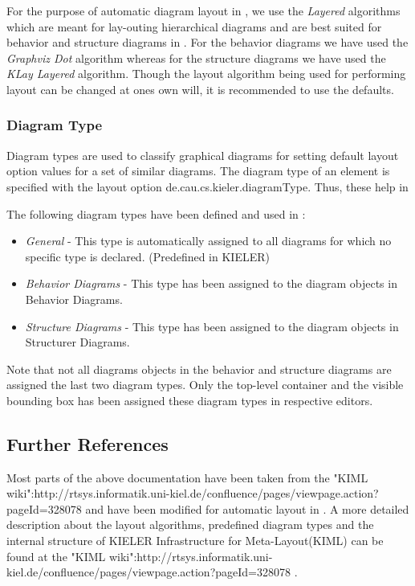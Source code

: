 For the purpose of automatic diagram layout in \eTrice{}, we use the \textit{Layered} algorithms which are 
meant for lay-outing hierarchical diagrams and are best suited for behavior and structure diagrams in 
\eTrice{}. For the behavior diagrams we have used the \textit{Graphviz Dot} algorithm whereas for the 
structure diagrams we have used the \textit{KLay Layered} algorithm. Though the layout algorithm being 
used for performing layout can be changed at ones own will, it is recommended to use the defaults.  

\subsubsection{Diagram Type}

Diagram types are used to classify graphical diagrams for setting default layout option values for a set 
of similar diagrams. The diagram type of an element is specified with the layout option 
de.cau.cs.kieler.diagramType. Thus, these help in 

The following diagram types have been defined and used in \eTrice{}:
\begin{itemize}
\item \textit{General} - This type is automatically assigned to all diagrams for which no specific type is 
declared. (Predefined in KIELER)
\item \textit{\eTrice{} Behavior Diagrams} - This type has been assigned to the diagram objects in \eTrice{} 
Behavior Diagrams. 
\item \textit{\eTrice{} Structure Diagrams} - This type has been assigned to the diagram objects in \eTrice{} 
Structurer Diagrams.
\end{itemize}
Note that not all diagrams objects in the behavior and structure diagrams are assigned the last two 
diagram types. Only the top-level container and the visible bounding box has been assigned these diagram 
types in respective editors.

\subsection{Further References}

Most parts of the above documentation have been taken from the "KIML 
wiki":http://rtsys.informatik.uni-kiel.de/confluence/pages/viewpage.action?pageId=328078 and have been 
modified for automatic layout in \eTrice{}. A more detailed description about the layout algorithms, 
predefined diagram types and the internal structure of KIELER Infrastructure for Meta-Layout(KIML) can be 
found at the "KIML 
wiki":http://rtsys.informatik.uni-kiel.de/confluence/pages/viewpage.action?pageId=328078 .